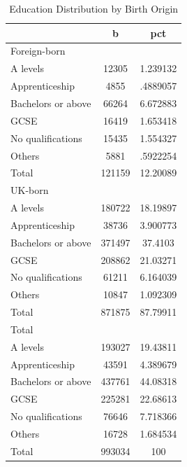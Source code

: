 \begin{table}[htbp]\centering
\def\sym#1{\ifmmode^{#1}\else\(^{#1}\)\fi}
\caption{Education Distribution by Birth Origin}
\begin{tabular}{l*{1}{cc}}
\hline\hline
                    &           b&         pct\\
\hline
Foreign-born        &            &            \\
A levels            &       12305&    1.239132\\
Apprenticeship      &        4855&    .4889057\\
Bachelors or above  &       66264&    6.672883\\
GCSE                &       16419&    1.653418\\
No qualifications   &       15435&    1.554327\\
Others              &        5881&    .5922254\\
Total               &      121159&    12.20089\\
\hline
UK-born             &            &            \\
A levels            &      180722&    18.19897\\
Apprenticeship      &       38736&    3.900773\\
Bachelors or above  &      371497&     37.4103\\
GCSE                &      208862&    21.03271\\
No qualifications   &       61211&    6.164039\\
Others              &       10847&    1.092309\\
Total               &      871875&    87.79911\\
\hline
Total               &            &            \\
A levels            &      193027&    19.43811\\
Apprenticeship      &       43591&    4.389679\\
Bachelors or above  &      437761&    44.08318\\
GCSE                &      225281&    22.68613\\
No qualifications   &       76646&    7.718366\\
Others              &       16728&    1.684534\\
Total               &      993034&         100\\
\hline\hline
\end{tabular}
\end{table}
